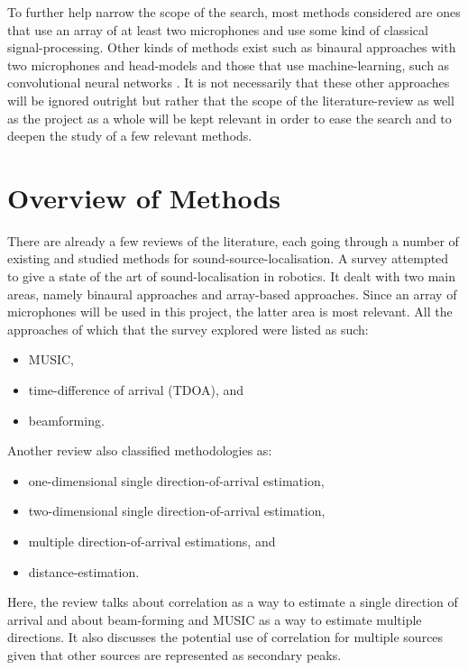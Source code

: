 \documentclass[notitlepage]{report}
\begin{document}
To further help narrow the scope of the search, most methods considered are ones that use an array of at least two microphones and use some kind of classical signal-processing. Other kinds of methods exist such as binaural approaches with two microphones and head-models \cite{argentieri_survey_2015} and those that use machine-learning, such as convolutional neural networks \cite{sakavicius_multiple_2022}. It is not necessarily that these other approaches will be ignored outright but rather that the scope of the literature-review as well as the project as a whole will be kept relevant in order to ease the search and to deepen the study of a few relevant methods.

\section{Overview of Methods}

There are already a few reviews of the literature, each going through a number of existing and studied methods for sound-source-localisation. A survey \cite{argentieri_survey_2015} attempted to give a state of the art of sound-localisation in robotics. It dealt with two main areas, namely binaural approaches and array-based approaches. Since an array of microphones will be used in this project, the latter area is most relevant. All the approaches of which that the survey explored were listed as such:
\begin{itemize}
	\item MUSIC,
	\item time-difference of arrival (TDOA), and
	\item beamforming.
\end{itemize}

Another review \cite{rascon_localization_2017} also classified methodologies as:
\begin{itemize}
	\item one-dimensional single direction-of-arrival estimation,
	\item two-dimensional single direction-of-arrival estimation,
	\item multiple direction-of-arrival estimations, and
	\item distance-estimation.
\end{itemize}
Here, the review talks about correlation as a way to estimate a single direction of arrival and about beam-forming and MUSIC as a way to estimate multiple directions. It also discusses the potential use of correlation for multiple sources given that other sources are represented as secondary peaks. 
\end{document}
